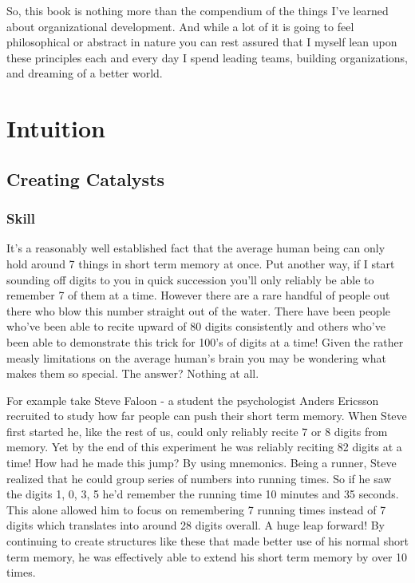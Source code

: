 \documentclass[11pt,a5paper]{book}
\begin{document}
So, this book is nothing more than the compendium of the things I've learned about organizational development. And while a lot of it is going to feel philosophical or abstract in nature you can rest assured that I myself lean upon these principles each and every day I spend leading teams, building organizations, and dreaming of a better world. 


\part{Intuition}
\chapter{Creating Catalysts}
\section{Skill}
It's a reasonably well established fact that the average human being can only hold around 7 things in short term memory at once. Put another way, if I start sounding off digits to you in quick succession you'll only reliably be able to remember 7 of them at a time. However there are a rare handful of people out there who blow this number straight out of the water. There have been people who've been able to recite upward of 80 digits consistently and others who've been able to demonstrate this trick for 100's of digits at a time! Given the rather measly limitations on the average human's brain you may be wondering what makes them so special. The answer? Nothing at all.
\newline

For example take Steve Faloon - a student the psychologist Anders Ericsson recruited to study how far people can push their short term memory. When Steve first started he, like the rest of us, could only reliably recite 7 or 8 digits from memory. Yet by the end of this experiment he was reliably reciting 82 digits at a time! How had he made this jump? By using mnemonics. Being a runner, Steve realized that he could group series of numbers into running times. So if he saw the digits 1, 0, 3, 5 he'd remember the running time 10 minutes and 35 seconds. This alone allowed him to focus on remembering 7 running times instead of 7 digits which translates into around 28 digits overall. A huge leap forward! By continuing to create structures like these that made better use of his normal short term memory, he was effectively able to extend his short term memory by over 10 times. 
\newline
\end{document}
